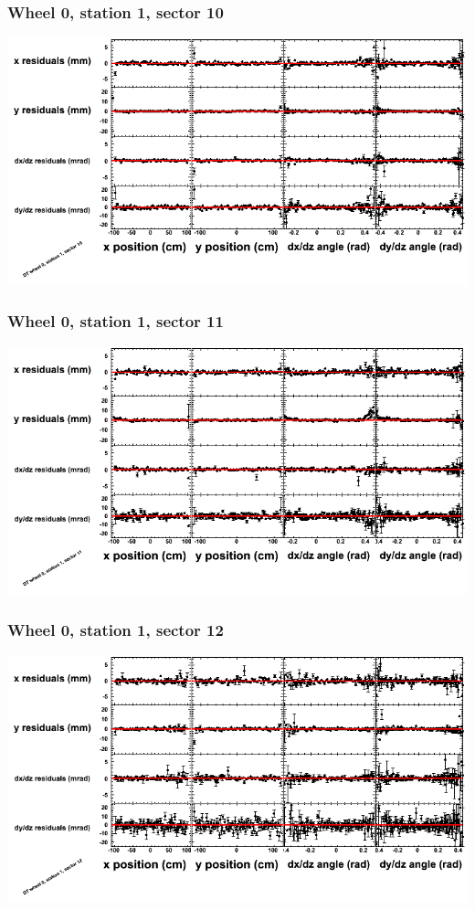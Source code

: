\documentclass[compress]{beamer}
\begin{document}
\begin{frame}
\frametitle{Wheel 0, station 1, sector 10}
\includegraphics[width=\linewidth]{tmppoly_MBwhCst1sec10.png}
\end{frame}

\begin{frame}
\frametitle{Wheel 0, station 1, sector 11}
\includegraphics[width=\linewidth]{tmppoly_MBwhCst1sec11.png}
\end{frame}

\begin{frame}
\frametitle{Wheel 0, station 1, sector 12}
\includegraphics[width=\linewidth]{tmppoly_MBwhCst1sec12.png}
\end{frame}
\end{document}
